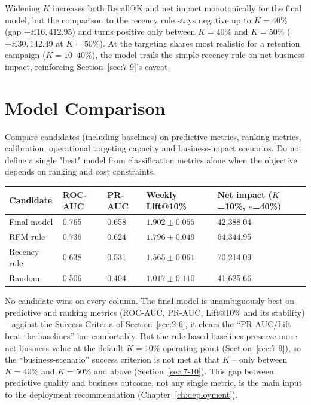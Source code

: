 Widening $K$ increases both Recall@K and net impact monotonically for the final model, but the comparison to the recency rule stays negative up to $K=40\%$ (gap $-\pounds16,412.95$) and turns positive only between $K=40\%$ and $K=50\%$ ($+\pounds30,142.49$ at $K=50\%$). At the targeting shares most realistic for a retention campaign ($K=10$--$40\%$), the model trails the simple recency rule on net business impact, reinforcing Section~\ref{sec:7-9}'s caveat.

\section{Model Comparison}
\label{sec:7-11}

Compare candidates (including baselines) on predictive metrics, ranking metrics, calibration, operational targeting capacity and business-impact scenarios. Do not define a single "best" model from classification metrics alone when the objective depends on ranking and cost constraints.

\begin{center}
\begin{tabular}{@{}p{2.8cm}p{1.6cm}p{1.6cm}p{2.8cm}p{2.8cm}@{}}
    \toprule
    Candidate & ROC-AUC & PR-AUC & Weekly Lift@10\% & Net impact ($K$=10\%, $e$=40\%) \\
    \midrule
    Final model & 0.765 & 0.658 & $1.902 \pm 0.055$ & 42,388.04 \\
    RFM rule & 0.736 & 0.624 & $1.796 \pm 0.049$ & 64,344.95 \\
    Recency rule & 0.638 & 0.531 & $1.565 \pm 0.061$ & 70,214.09 \\
    Random & 0.506 & 0.404 & $1.017 \pm 0.110$ & 41,625.66 \\
    \bottomrule
\end{tabular}
\end{center}

No candidate wins on every column. The final model is unambiguously best on predictive and ranking metrics (ROC-AUC, PR-AUC, Lift@10\% and its stability) -- against the Success Criteria of Section~\ref{sec:2-6}, it clears the ``PR-AUC/Lift beat the baselines'' bar comfortably. But the rule-based baselines preserve more net business value at the default $K=10\%$ operating point (Section~\ref{sec:7-9}), so the ``business-scenario'' success criterion is not met at that $K$ -- only between $K=40\%$ and $K=50\%$ and above (Section~\ref{sec:7-10}). This gap between predictive quality and business outcome, not any single metric, is the main input to the deployment recommendation (Chapter~\ref{ch:deployment}).

